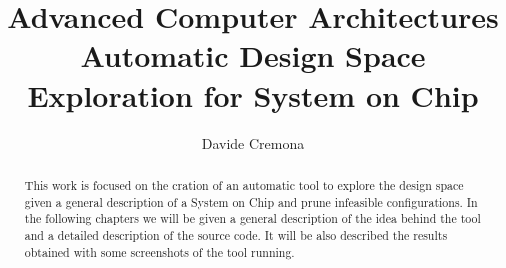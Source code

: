 \documentclass{article}
\title{Advanced Computer Architectures \\ Automatic Design Space Exploration for System on Chip}
\author{Davide Cremona}
\begin{document}
  \maketitle

  \begin{abstract}
    This work is focused on the cration of an automatic tool to explore the design space given a general description of a System on Chip and prune infeasible configurations. In the following chapters we will be given a general description of the idea behind the tool and a detailed description of the source code. It will be also described the results obtained with some screenshots of the tool running.
  \end{abstract}

  
  
  
  
\end{document}
